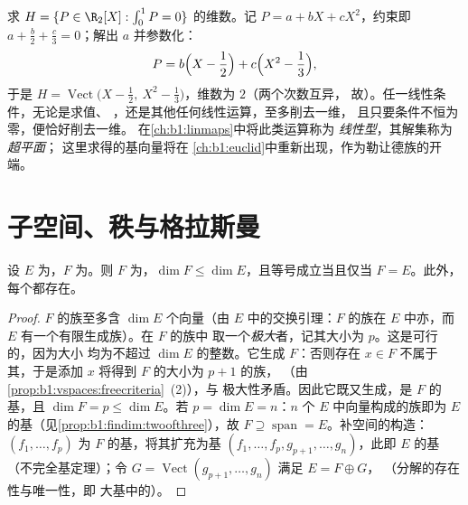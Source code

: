 \begin{example}[积分约束同样削去一维]
\label{ex:b1:findim:integralconstraint}
求 $H = \{P \in \R_2[X] : \int_0^1 P = 0\}$ 的维数。记
$P = a + bX + cX^2$，约束即 $a + \frac b2 + \frac
c3 = 0$；解出 $a$ 并参数化：
\[
P = b\Bigl(X - \frac12\Bigr) + c\Bigl(X^2 - \frac13\Bigr),
\]
于是 $H = \operatorname{Vect}\bigl(X - \frac12,\ X^2 -
\frac13\bigr)$，维数为 $2$（两个次数互异，
故）。任一线性条件，无论是求值、
，还是其他任何线性运算，至多削去一维，
且只要条件不恒为零，便恰好削去一维。
在\cref{ch:b1:linmaps}中将此类运算称为
\emph{线性型}，其解集称为\emph{超平面}；
这里求得的基向量将在
\cref{ch:b1:euclid}中重新出现，作为勒让德族的开端。
\end{example}

\section{子空间、秩与格拉斯曼}

\begin{theorem}[子空间]\label{thm:b1:findim:subspaces}
设 $E$ 为，$F$ 为。则 $F$
为，$\dim F \leq \dim E$，且等号成立当且仅当
$F = E$。此外，每个都存在。
\end{theorem}

\begin{proof}
$F$ 的族至多含 $\dim E$ 个向量（由
$E$ 中的交换引理：$F$ 的族在 $E$ 中亦，而 $E$
有一个有限生成族）。在 $F$ 的族中
取一个\emph{极大}者，记其大小为 $p$。这是可行的，因为大小
均为不超过 $\dim E$ 的整数。它生成 $F$：否则存在
$x \in F$ 不属于其，于是添加 $x$ 将得到
$F$ 的大小为 $p + 1$ 的族，
（由\cref{prop:b1:vspaces:freecriteria}~(2)），与
极大性矛盾。因此它既又生成，是 $F$ 的基，且
$\dim F = p \leq \dim E$。若 $p = \dim E = n$：$n$ 个
$E$ 中向量构成的族即为 $E$ 的基（见\cref{prop:b1:findim:twoofthree}），故 $F
\supseteq \operatorname{span} = E$。补空间的构造：
$(f_1, \dots, f_p)$ 为 $F$ 的基，将其扩充为基 $(f_1, \dots, f_p, g_{p+1},
\dots, g_n)$，此即 $E$ 的基（不完全基定理）；令 $G =
\operatorname{Vect}(g_{p+1}, \dots, g_n)$ 满足 $E = F \oplus G$，
（分解的存在性与唯一性，即
大基中的）。
\end{proof}

